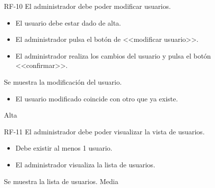 {RF-10}
{El administrador debe poder modificar usuarios.}
{	\begin{itemize}
	\def\labelenumi{\arabic{enumi}.}
	\tightlist
	\item El usuario debe estar dado de alta.
	\end{itemize}}
{
	\begin{itemize}
	\def\labelenumi{\arabic{enumi}.}
	\tightlist

    \item El administrador pulsa el botón de <<modificar usuario>>.
    \item El administrador realiza los cambios del usuario y pulsa el botón <<confirmar>>.
    \end{itemize}
}
{Se muestra la modificación del usuario.}
{\begin{itemize}
	\def\labelenumi{\arabic{enumi}.}
	\tightlist

    \item El usuario modificado coincide con otro que ya existe.
    \end{itemize}}
{Alta}

{RF-11}
{El administrador debe poder visualizar la vista de usuarios.}
{	\begin{itemize}
	\def\labelenumi{\arabic{enumi}.}
	\tightlist
	\item Debe existir al menos 1 usuario.
	\end{itemize}}
{
	\begin{itemize}
	\def\labelenumi{\arabic{enumi}.}
	\tightlist

    \item El administrador visualiza la lista de usuarios.
    \end{itemize}
}
{Se muestra la lista de usuarios.}
{}
{Media}
